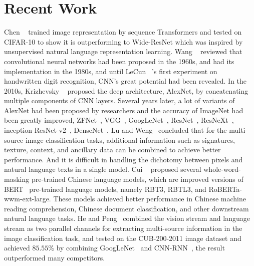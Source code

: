 \documentclass[review]{cvpr}
\begin{document}

\section{Recent Work}

  Chen \etal~\cite{chen2020generative} trained image representation by sequence Transformers and tested on CIFAR-10 to show it is outperforming to Wide-ResNet
which was inspired by unsupervised natural language representation learning.
  Wang \etal~\cite{wang2019development} reviewed that convolutional neural networks had been proposed in the 1960s, and had its implementation in the 1980s,
and until LeCun \etal~\cite{lecun1990handwritten}'s first experiment on handwritten digit recognition, CNN's great potential had been revealed.
  In the 2010s, Krizhevsky \etal~\cite{krizhevsky2012imagenet} proposed the deep architecture, AlexNet, by concatenating multiple components of CNN layers.
Several years later, a lot of variants of AlexNet had been proposed by researchers and the accuracy of ImageNet had been greatly improved, \eg ZFNet~\cite{zeiler2014visualizing}, VGG~\cite{simonyan2014very}, GoogLeNet~\cite{szegedy2015going}, ResNet~\cite{he2016deep},
 ResNeXt~\cite{xie2017aggregated}, inception-ResNet-v2~\cite{szegedy2016inception}, DenseNet~\cite{huang2016deep}.
  Lu and Weng~\cite{lu2007survey} concluded that for the multi-source image classification tasks, additional information such as signatures, texture, context, and ancillary data can be combined to achieve better performance.
And it is difficult in handling the dichotomy between pixels and natural language texts in a single model.
  Cui \etal~\cite{cui2020revisiting} proposed several whole-word-masking pre-trained Chinese language models,
which are improved versions of BERT~\cite{devlin2019bert} pre-trained language models, namely RBT3, RBTL3, and RoBERTa-wwm-ext-large.
These models achieved better performance in Chinese machine reading comprehension, Chinese document classification, and other downstream natural language tasks.
  He and Peng~\cite{he2017fine} combined the vision stream and language stream as two parallel channels for extracting multi-source information in the image classification task,
and tested on the CUB-200-2011 image dataset and achieved $85.55\%$ by combining GoogLeNet~\cite{szegedy2015going} and CNN-RNN~\cite{reed2016learning}, the result outperformed many competitors.

\end{document}

